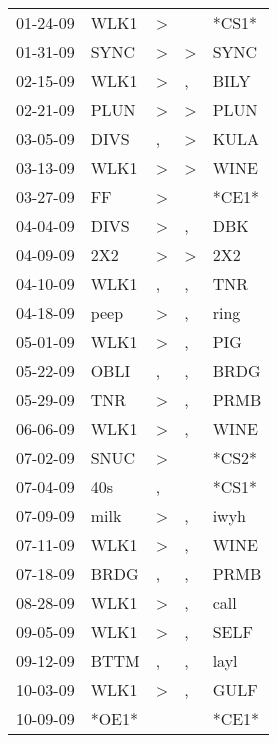 \begin{supertabular}{lllll}
 01-24-09 &   WLK1 &  \textgreater &               &  *CS1* \\
 01-31-09 &   SYNC &  \textgreater &  \textgreater &   SYNC \\
 02-15-09 &   WLK1 &  \textgreater &             , &   BILY \\
 02-21-09 &   PLUN &  \textgreater &  \textgreater &   PLUN \\
 03-05-09 &   DIVS &             , &  \textgreater &   KULA \\
 03-13-09 &   WLK1 &  \textgreater &  \textgreater &   WINE \\
 03-27-09 &     FF &  \textgreater &               &  *CE1* \\
 04-04-09 &   DIVS &  \textgreater &             , &    DBK \\
 04-09-09 &    2X2 &  \textgreater &  \textgreater &    2X2 \\
 04-10-09 &   WLK1 &             , &             , &    TNR \\
 04-18-09 &   peep &  \textgreater &             , &   ring \\
 05-01-09 &   WLK1 &  \textgreater &             , &    PIG \\
 05-22-09 &   OBLI &             , &             , &   BRDG \\
 05-29-09 &    TNR &  \textgreater &             , &   PRMB \\
 06-06-09 &   WLK1 &  \textgreater &             , &   WINE \\
 07-02-09 &   SNUC &  \textgreater &               &  *CS2* \\
 07-04-09 &    40s &             , &               &  *CS1* \\
 07-09-09 &   milk &  \textgreater &             , &   iwyh \\
 07-11-09 &   WLK1 &  \textgreater &             , &   WINE \\
 07-18-09 &   BRDG &             , &             , &   PRMB \\
 08-28-09 &   WLK1 &  \textgreater &             , &   call \\
 09-05-09 &   WLK1 &  \textgreater &             , &   SELF \\
 09-12-09 &   BTTM &             , &             , &   layl \\
 10-03-09 &   WLK1 &  \textgreater &             , &   GULF \\
 10-09-09 &  *OE1* &               &               &  *CE1* \\

\end{supertabular}
